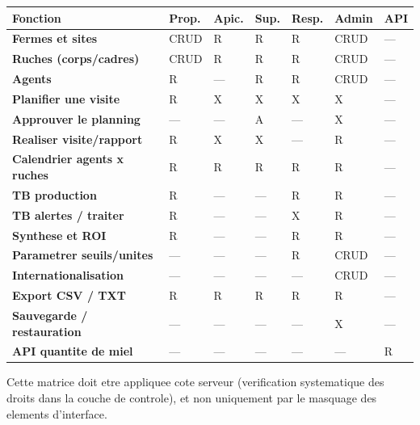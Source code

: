 \begin{xltabular}{\textwidth}{>{\bfseries}X C{1.3cm} C{1.3cm} C{1.3cm} C{1.3cm} C{1.3cm} C{1.3cm}}
\toprule
\textbf{Fonction} & \textbf{Prop.} & \textbf{Apic.} & \textbf{Sup.} & \textbf{Resp.} & \textbf{Admin} & \textbf{API} \\
\midrule
\endhead
Fermes et sites          & CRUD & R    & R    & R    & CRUD & --- \\
Ruches (corps/cadres)    & CRUD & R    & R    & R    & CRUD & --- \\
Agents                   & R    & ---  & R    & R    & CRUD & --- \\
Planifier une visite     & R    & X    & X    & X    & X    & --- \\
Approuver le planning    & ---  & ---  & A    & ---  & X    & --- \\
Realiser visite/rapport  & R    & X    & X    & ---  & R    & --- \\
Calendrier agents x ruches & R  & R    & R    & R    & R    & --- \\
TB production            & R    & ---  & ---  & R    & R    & --- \\
TB alertes / traiter     & R    & ---  & ---  & X    & R    & --- \\
Synthese et ROI          & R    & ---  & ---  & R    & R    & --- \\
Parametrer seuils/unites & ---  & ---  & ---  & R    & CRUD & --- \\
Internationalisation     & ---  & ---  & ---  & ---  & CRUD & --- \\
Export CSV / TXT         & R    & R    & R    & R    & R    & --- \\
Sauvegarde / restauration & --- & ---  & ---  & ---  & X    & --- \\
API quantite de miel     & ---  & ---  & ---  & ---  & ---  & R \\
\bottomrule
\end{xltabular}

\begin{encadre}
Cette matrice doit etre appliquee cote serveur (verification systematique des
droits dans la couche de controle), et non uniquement par le masquage des
elements d'interface.
\end{encadre}


